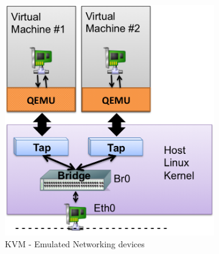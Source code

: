 \begin{enumerate}
\begin{figure}
        \centering
        \begin{subfigure}[b]{0.35\textwidth}
                \includegraphics[width=\textwidth]{kvm-emulated.png}
                \caption{KVM - Emulated Networking devices}
                \label{fig:kvm-emulated}
        \end{subfigure}%
        ~ %
        \qquad \hspace{8 mm}
        \begin{subfigure}[b]{0.35\textwidth}

\end{subfigure}
\end{figure}
\end{enumerate}
